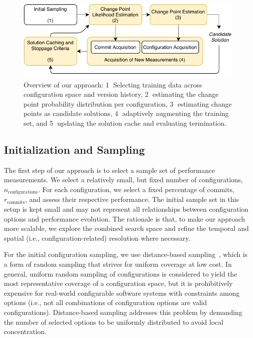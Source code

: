 \documentclass[sigconf]{acmart}
\begin{document}
	\begin{figure}[ht]
		\includegraphics[width=\linewidth]{images/diagram_april.pdf}
		\caption{Overview of our approach:  \textcircled{1} Selecting training data across configuration space and version history, \textcircled{2} estimating the change point probability distribution per configuration, \textcircled{3} estimating change points as candidate solutions, \textcircled{4} adaptively augmenting the training set, and \textcircled{5} updating the solution cache and evaluating termination.}
		\label{fig:overview}
	\end{figure}
	
	\subsection{Initialization and Sampling}\label{sec:initialization}
	The first step of our approach is to select a sample set of performance measurements. 
	We select a relatively small, but fixed number of configurations, $n_\text{configurations}$. For each configuration, we select a fixed percentage of commits, $r_\text{commits}$, and assess their respective performance.
	The initial sample set in this setup is kept small and may not represent all relationships between configuration options and performance evolution. 
	The rationale is that, to make our approach more scalable, we explore the combined search space and refine the temporal and  spatial (i.e., configuration-related) resolution where necessary. 
	
	For the initial configuration sampling, we use distance-based  sampling~\cite{kaltenecker_distance-based_2019}, which is a form of random sampling that strives for uniform coverage at low cost. 
	In general, uniform random sampling of configurations is considered to yield the most representative coverage of a configuration space, but it is prohibitively expensive for real-world configurable software systems with constraints among options (i.e., not all combinations of configuration options are valid configurations). 
	Distance-based sampling addresses this problem by demanding the number of selected options to be uniformly distributed to avoid local concentration. 
	
\end{document}
